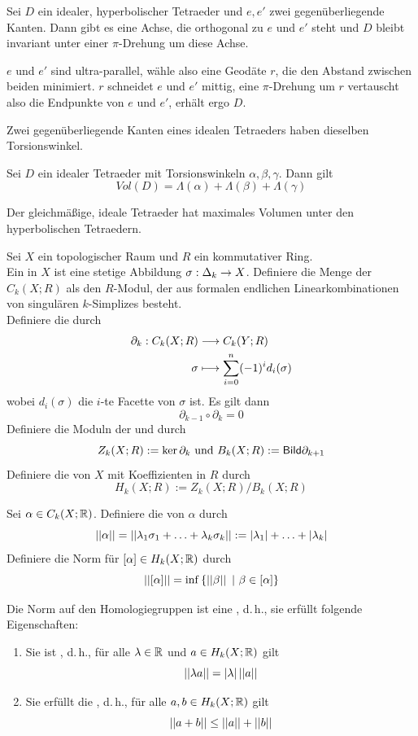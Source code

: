 \documentclass{book}
\begin{document}
\Lem{}
Sei $D$ ein idealer, hyperbolischer Tetraeder und $e,e'$ zwei gegenüberliegende Kanten. Dann gibt es eine Achse, die orthogonal zu $e$ und $e'$ steht und $D$ bleibt invariant unter einer $\pi$-Drehung um diese Achse.
\begin{Beweis}{}
	$e$ und $e'$ sind ultra-parallel, wähle also eine Geodäte $r$, die den Abstand zwischen beiden minimiert. $r$ schneidet $e$ und $e'$ mittig, eine $\pi$-Drehung um $r$ vertauscht also die Endpunkte von $e$ und $e'$, erhält ergo $D$.
\end{Beweis}

\Kor{}
Zwei gegenüberliegende Kanten eines idealen Tetraeders haben dieselben Torsionswinkel.

\Satz{}
Sei $D$ ein idealer Tetraeder mit Torsionswinkeln $\alpha, \beta, \gamma$. Dann gilt
\[ Vol(D) = \Lambda(\alpha) + \Lambda(\beta) + \Lambda(\gamma) \]

\Kor{}
Der gleichmäßige, ideale Tetraeder hat maximales Volumen unter den hyperbolischen Tetraedern.

Sei $X$ ein topologischer Raum und $R$ ein kommutativer Ring.\\
Ein  in $X$ ist eine stetige Abbildung $\sigma : \Delta_k \overset{}{\rightarrow} X$. Definiere die Menge der  $C_k(X; R)$ als den $R$-Modul, der aus formalen endlichen Linearkombinationen von singulären $k$-Simplizes besteht.\\
Definiere die  durch
\begin{align*}
\partial_k : C_k(X;R) & \overset{}{\longrightarrow} C_k(Y;R)\\
\sigma & \longmapsto \sum_{i = 0}^n (-1)^id_i(\sigma)
\end{align*}
wobei $d_i(\sigma)$ die $i$-te Facette von $\sigma$ ist. Es gilt dann
\[ \partial_{k-1} \circ \partial_k = 0 \]
Definiere die Moduln der  und  durch
\[ Z_k(X;R) := \ker \partial_k \text{ und } B_k(X;R) := \textsf{Bild} \partial_{k+1} \]
Definiere die  von $X$ mit Koeffizienten in $R$ durch
\[ H_k(X;R) := Z_k(X;R) / B_k(X;R) \]

\Def{}
Sei $\alpha \in C_k(X;\mathbb{R})$. Definiere die  von $\alpha$ durch
\[ \left|\left|\alpha\right|\right| = \left|\left|\lambda_1 \sigma_1 + \ldots + \lambda_k \sigma_k\right|\right| := \left|\lambda_1\right| + \ldots + \left|\lambda_k\right| \]
Definiere die Norm für $[\alpha] \in H_k(X;\mathbb{R})$ durch
\[ \norm{[\alpha]} = \inf \set{\norm{\beta}}{\beta \in [\alpha]} \]

\Prop{}
Die Norm auf den Homologiegruppen ist eine , d.\,h., sie erfüllt folgende Eigenschaften:
\begin{enumerate}[(1)]
	\item Sie ist , d.\,h., für alle $\lambda \in \mathbb{R}$ und $a \in H_k(X;\mathbb{R})$ gilt
	\[ \left|\left| \lambda a\right|\right| = \left|\lambda\right| \left|\left|a\right|\right| \]
	\item Sie erfüllt die , d.\,h., für alle $a,b \in H_k(X;\mathbb{R})$ gilt
	\[ \left|\left|a+ b\right|\right| \leq\left|\left|a\right|\right| + \left|\left|b\right|\right| \]
\end{enumerate}
\end{document}
